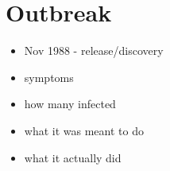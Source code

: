 \section*{Outbreak}

\begin{itemize}
\item Nov 1988 - release/discovery
\item symptoms
\item how many infected
\item what it was meant to do 
\item what it actually did
\end{itemize}